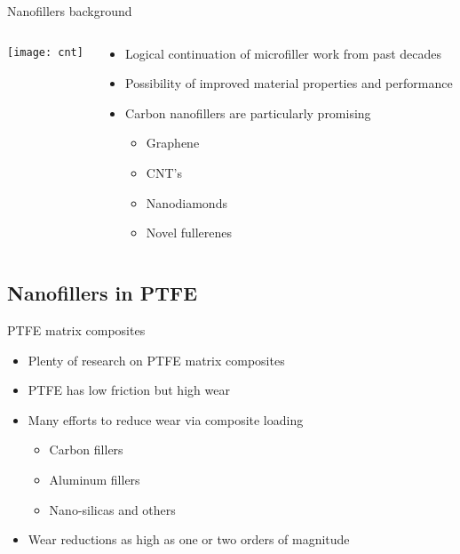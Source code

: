 \documentclass[12pt,letterpaper]{beamer}
\begin{document}
\begin{frame}{Nanofillers background}
  \begin{columns}[T]
      \begin{column}{.5\textwidth}
    \begin{block}{}
\texttt{[image: cnt]}
    \end{block}
    \end{column}
    \begin{column}{.5\textwidth}
     \begin{block}{}
\begin{itemize}
\item Logical continuation of microfiller work from past decades
\item Possibility of improved material properties and performance
\item Carbon nanofillers are particularly promising
\begin{itemize}
\item Graphene
\item CNT's
\item Nanodiamonds
\item Novel fullerenes
\end{itemize}
\end{itemize}   
    \end{block}
    \end{column}
  \end{columns}
\end{frame}

\subsection{Nanofillers in PTFE}

\begin{frame}{PTFE matrix composites}
\begin{itemize}
\item Plenty of research on PTFE matrix composites \cite{mcelwain2008effect, burris2006improved,Burris2009653,chen_tribological_2003}
\item PTFE has low friction but high wear
\item Many efforts to reduce wear via composite loading
\begin{itemize}
\item Carbon fillers
\item Aluminum fillers
\item Nano-silicas and others
\end{itemize}
\item Wear reductions as high as one or two orders of magnitude \cite{MAME200600416,Lai2004916,Blanchet201011,sawyer2003study}
\end{itemize}
\end{frame}
\end{document}
